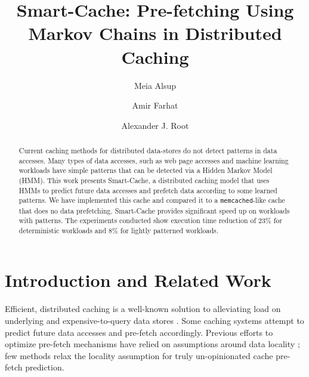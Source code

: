 \documentclass[sigconf]{acmart}
\begin{document}
\title{Smart-Cache: Pre-fetching Using Markov Chains in Distributed Caching}

\author{Meia Alsup}

\author{Amir Farhat}
\authornotemark[1]
\author{Alexander J. Root}
\authornotemark[1]

\renewcommand{\shortauthors}{Alsup*, Farhat*, Root*}

\begin{abstract}
Current caching methods for distributed data-stores do not detect patterns in data accesses. Many types of data accesses, such as web page accesses and machine learning workloads have simple patterns that can be detected via a Hidden Markov Model (HMM). This work presents Smart-Cache, a distributed caching model that uses HMMs to predict future data accesses and prefetch data according to some learned patterns. We have implemented this cache and compared it to a \texttt{memcached}-like cache that does no data prefetching. Smart-Cache provides significant speed up on workloads with patterns. The experiments conducted show execution time reduction of 23\% for deterministic workloads and 8\% for lightly patterned workloads.

\end{abstract}


\maketitle

\section{Introduction and Related Work}
\label{sec:intro}

Efficient, distributed caching is a well-known solution to alleviating load on underlying and expensive-to-query data stores \cite{Memcached}. Some caching systems attempt to predict future data accesses and pre-fetch accordingly.  Previous efforts to optimize pre-fetch mechanisms have relied on assumptions around data locality \cite{SequentialPrefetch}; few methods relax the locality assumption for truly un-opinionated cache pre-fetch prediction. 
\end{document}
